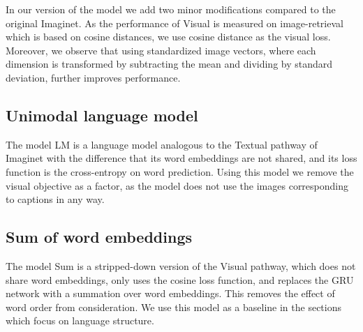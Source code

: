 In our version of the model we add two minor modifications 
compared to the original {\sc Imaginet}. As the performance of
{\sc Visual} is measured on image-retrieval which is based on cosine 
distances, we use cosine distance as the visual loss.
Moreover, we observe that using standardized image vectors, where each dimension 
is transformed by subtracting the mean and dividing by standard deviation, further
improves performance.






\subsection{Unimodal language model}
The model {\sc LM} is a language model analogous to the {\sc Textual}
pathway of {\sc Imaginet} with the difference that its word embeddings
are not shared, and its loss function is the cross-entropy on word
prediction. Using this model we remove the visual objective as a
factor, as the model does not use the images corresponding to captions
in any way.

\subsection{Sum of word embeddings}
The model {\sc Sum} is a stripped-down version of the {\sc Visual}
pathway, which does not share word embeddings, only uses the cosine
loss function, and replaces the GRU network with a summation over word
embeddings. This removes the effect of word order from
consideration. We use this model as a baseline in the sections which
focus on language structure. 

